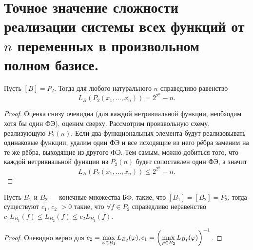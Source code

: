 \section{Точное значение сложности реализации системы всех функций от $n$ переменных в произвольном полном базисе.}

\begin{theorem}
    Пусть $[B] = P_2$. Тогда для любого натурального $n$ справедливо равенство
    \[
        L_B(P_2(x_1, \ldots, x_n)) = 2^{2^n} - n.
    \]
\end{theorem}

\begin{proof}
    Оценка снизу очевидна (для каждой нетривиальной функции, необходим хотя бы один ФЭ), оценим сверху. Рассмотрим произвольную схему, реализующую $P_2(n)$. Если два функциональных элемента будут реализовывать одинаковые функции, удалим один ФЭ и все исходящие из него рёбра заменим на те же рёбра, выходящие из другого ФЭ. Тем самым, можно добиться того, что каждой нетривиальной функции из $P_2(n)$ будет сопоставлен один ФЭ, а значит
    \[
        L_B(P_2(x_1, \ldots, x_n)) \leqslant 2^{2^n} - n.
    \]
\end{proof}

\begin{lemma}
    Пусть $B_1$ и $B_2$ --- конечные множества БФ, такие, что $[B_1] = [B_2] = P_2$, тогда существуют $c_1$, $c_2$ $>0$ такие, что $\forall f \in P_2$ справедливо неравенство $c_1L_{B_1}(f)\leqslant L_{B_2}(f) \leqslant c_2L_{B_1}(f)$.
\end{lemma}

\begin{proof}
    Очевидно верно для $\displaystyle c_2 = \max_{\varphi \in B_1} L_{B_2}(\varphi), c_1 = \left(\max_{\varphi \in B_2} L_{B_1}(\varphi)\right)^{-1}$.
\end{proof}
